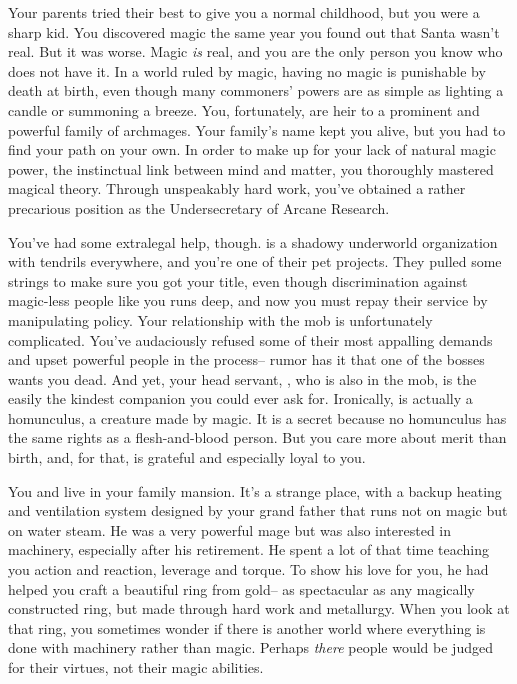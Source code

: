 \documentclass[char]{guildcamp3}
\begin{document}
\name{\cNobleOne{}}





Your parents tried their best to give you a normal childhood, but you were a sharp kid. You discovered magic the same year you found out that Santa wasn't real. But it was worse. Magic \emph{is} real, and you are the only person you know who does not have it. In a world ruled by magic, having no magic is punishable by death at birth, even though many commoners' powers are as simple as lighting a candle or summoning a breeze. You, fortunately, are heir to a prominent and powerful family of archmages. Your family's name kept you alive, but you had to find your path on your own. In order to make up for your lack of natural magic power, the instinctual link between mind and matter, you thoroughly mastered magical theory. Through unspeakably hard work, you've obtained a rather precarious position as the Undersecretary of Arcane Research.

You've had some extralegal help, though. \bMagicMob{} is a shadowy underworld organization with tendrils everywhere, and you're one of their pet projects. They pulled some strings to make sure you got your title, even though discrimination against magic-less people like you runs deep, and now you must repay their service by manipulating policy. Your relationship with the mob is unfortunately complicated. You've audaciously refused some of their most appalling demands and upset powerful people in the process-- rumor has it that one of the bosses wants you dead. And yet, your head servant, \cServant{\intro}, who is also in the mob, is the easily the kindest companion you could ever ask for. Ironically,  is actually a homunculus, a creature made by magic. It is a secret because no homunculus has the same rights as a flesh-and-blood person. But you care more about merit than birth, and, for that, \cServant{} is grateful and especially loyal to you. 

You and  \cServant{\intro} live in your family mansion. It's a strange place, with a backup heating and ventilation system designed by your grand father that runs not on magic but on water steam. He was a very powerful mage but was also interested in machinery, especially after his retirement. He spent a lot of that time teaching you action and reaction, leverage and torque. To show his love for you, he had helped you craft a beautiful ring from gold-- as spectacular as any magically constructed ring, but made through hard work and metallurgy. When you look at that ring, you sometimes wonder if there is another world where everything is done with machinery rather than magic. Perhaps \emph{there} people would be judged for their virtues, not their magic abilities.
\end{document}
